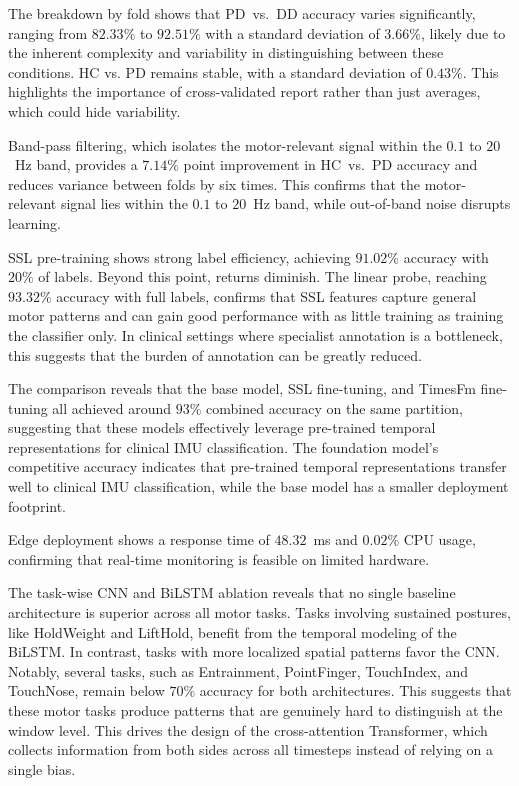 \documentclass[pmlr]{jmlr}
\begin{document}
The breakdown by fold shows that PD~vs.~DD accuracy varies significantly, ranging from $82.33\%$ to $92.51\%$ with a standard deviation of $3.66\%$, likely due to the inherent complexity and variability in distinguishing between these conditions. HC vs. PD remains stable, with a standard deviation of $0.43\%$. This highlights the importance of cross-validated report rather than just averages, which could hide variability.

Band-pass filtering, which isolates the motor-relevant signal within the $0.1$ to $20$~Hz band, provides a $7.14\%$ point improvement in HC~vs.~PD accuracy and reduces variance between folds by six times. This confirms that the motor-relevant signal lies within the $0.1$ to $20$~Hz band, while out-of-band noise disrupts learning. 

SSL pre-training shows strong label efficiency, achieving $91.02\%$ accuracy with $20\%$ of labels. Beyond this point, returns diminish. The linear probe, reaching $93.32\%$ accuracy with full labels, confirms that SSL features capture general motor patterns and can gain good performance with as little training as training the classifier only. In clinical settings where specialist annotation is a bottleneck, this suggests that the burden of annotation can be greatly reduced.

The comparison reveals that the base model, SSL fine-tuning, and TimesFm fine-tuning all achieved around $93\%$ combined accuracy on the same partition, suggesting that these models effectively leverage pre-trained temporal representations for clinical IMU classification. The foundation model's competitive accuracy indicates that pre-trained temporal representations transfer well to clinical IMU classification, while the base model has a smaller deployment footprint.

Edge deployment shows a response time of $48.32$~ms and $0.02\%$ CPU usage, confirming that real-time monitoring is feasible on limited hardware. 

The task-wise CNN and BiLSTM ablation reveals that no single baseline architecture is superior across all motor tasks. Tasks involving sustained postures, like HoldWeight and LiftHold, benefit from the temporal modeling of the BiLSTM. In contrast, tasks with more localized spatial patterns favor the CNN. Notably, several tasks, such as Entrainment, PointFinger, TouchIndex, and TouchNose, remain below $70\%$ accuracy for both architectures. This suggests that these motor tasks produce patterns that are genuinely hard to distinguish at the window level. This drives the design of the cross-attention Transformer, which collects information from both sides across all timesteps instead of relying on a single bias.
\end{document}
